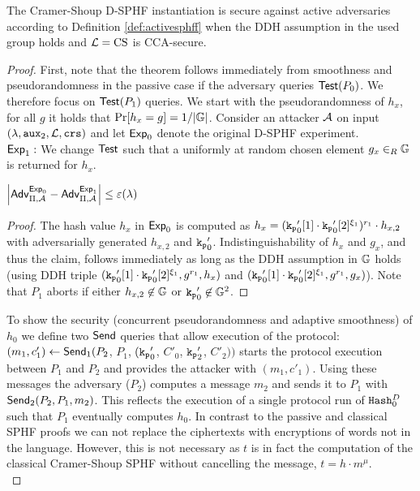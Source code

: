 \begin{theorem}\label{theo:cssphff}
The Cramer-Shoup \ac{D-SPHF} instantiation is secure against active adversaries according to Definition \ref{def:activesphff} when the \ac{DDH} assumption in the used group \GG holds and $\mathcal{L}=\mathrm{CS}$ is \ac{CCA}-secure.
\end{theorem}
\begin{proof}
First, note that the theorem follows immediately from smoothness and pseudorandomness in the passive case if the adversary queries $\mathsf{Test}(P_0)$.
We therefore focus on $\mathsf{Test}(P_1)$ queries.
We start with the pseudorandomness of $h_x$, \ie for all $g$ it holds that $\Pr[h_x=g]=1/|\mathbb{G}|$.
Consider an attacker $\mathcal{A}$ on input $(\lambda,\mathtt{aux}_2,\mathcal{L},\mathtt{crs})$ and let $\mathsf{Exp}_0$ denote the original \ac{D-SPHF} experiment.\\

\noindent$\mathsf{Exp}_1:$
We change $\mathsf{Test}$ such that a uniformly at random chosen element $g_x\in_R\mathbb{G}$ is returned for $h_x$.

\begin{claim}
$\left|\mathsf{Adv}_{\Pi,\mathcal{A}}^{\mathsf{Exp}_0}-\mathsf{Adv}_{\Pi,\mathcal{A}}^{\mathsf{Exp}_1}\right|\leq\varepsilon(\lambda)$
\end{claim}

\begin{proof}
The hash value $h_x$ in $\mathsf{Exp}_0$ is computed as $h_x=(\mathtt{k_p}'_0[1]\cdot\mathtt{k_p}'_0[2]^{\xi_1})^{r_1}\cdot h_{x,2}$ with adversarially generated $h_{x,2}$ and $\mathtt{k_p}'_0$.
Indistinguishability of $h_x$ and $g_x$, and thus the claim, follows immediately as long as the \ac{DDH} assumption in $\mathbb{G}$ holds (using \ac{DDH} triple $(\mathtt{k_p}'_0[1]\cdot\mathtt{k_p}'_0[2]^{\xi_1},g^{r_1},h_x)$ and $(\mathtt{k_p}'_0[1]\cdot\mathtt{k_p}'_0[2]^{\xi_1},g^{r_1},g_x)$).
Note that $P_1$ aborts if either $h_{x,2}\not\in\mathbb{G}$ or $\mathtt{k_p}_0'\not\in\mathbb{G}^2$.
\end{proof}

\noindent
To show the security (concurrent pseudorandomness and adaptive smoothness) of $h_0$ we define two $\mathsf{Send}$ queries that allow execution of the protocol:
$(m_1,c'_1)\gets\mathsf{Send}_1(P_2$, $P_1$, $(\mathtt{k_p}'_0$, $C'_0$, $\mathtt{k_p}'_2$, $C'_2))$ starts the protocol execution between $P_1$ and $P_2$ and provides the attacker with $(m_1,c'_1)$.
Using these messages the adversary ($P_2$) computes a message $m_2$ and sends it to $P_1$ with $\mathsf{Send}_2(P_2,P_1,m_2)$.
This reflects the execution of a single protocol run of $\mathtt{Hash}_0^D$ such that $P_1$ eventually computes $h_0$.
In contrast to the passive and classical SPHF proofs we can not replace the ciphertexts with encryptions of words not in the language.
However, this is not necessary as $t$ is in fact the \Hash computation of the classical Cramer-Shoup SPHF without cancelling the message, \ie $t=h\cdot m^\mu$.\\


\end{proof}
